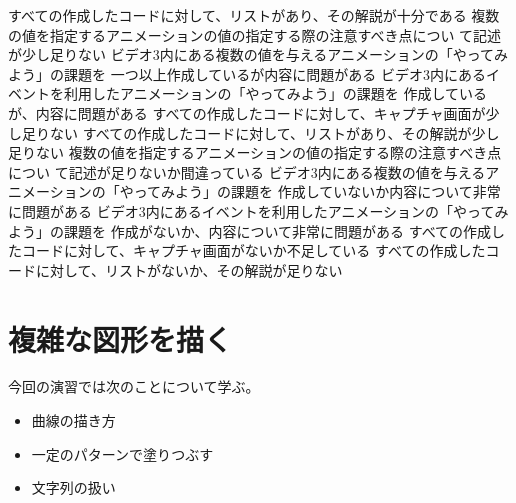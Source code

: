 \documentclass[a4j]{jreport}
\newcommand{\changePage}[1]{
 \renewcommand{\thepage}{第\thechapter 回(#1)-\arabic{page}}
  \setcounter{page}{1}
}
\begin{document}
{{	{すべての作成したコードに対して、リストがあり、その解説が十分である}
  }
	{
	{複数の値を指定するアニメーションの値の指定する際の注意すべき点につい
	て記述が少し足りない}
	{ビデオ3内にある複数の値を与えるアニメーションの「やってみよう」の課題を
一つ以上作成しているが内容に問題がある}
	{ビデオ3内にあるイベントを利用したアニメーションの「やってみよう」の課題を
作成しているが、内容に問題がある}
	{すべての作成したコードに対して、キャプチャ画面が少し足りない}
	{すべての作成したコードに対して、リストがあり、その解説が少し足りない}
  }
	{
	{複数の値を指定するアニメーションの値の指定する際の注意すべき点につい
	て記述が足りないか間違っている}
	{ビデオ3内にある複数の値を与えるアニメーションの「やってみよう」の課題を
作成していないか内容について非常に問題がある}
	{ビデオ3内にあるイベントを利用したアニメーションの「やってみよう」の課題を
作成がないか、内容について非常に問題がある}
	{すべての作成したコードに対して、キャプチャ画面がないか不足している}
	{すべての作成したコードに対して、リストがないか、その解説が足りない}
	}
 	}
\chapter{複雑な図形を描く}
\changePage{5/9}
今回の演習では次のことについて学ぶ。
\begin{itemize}
 \item 曲線の描き方
 \item 一定のパターンで塗りつぶす
 \item 文字列の扱い
\end{itemize}
\end{document}
